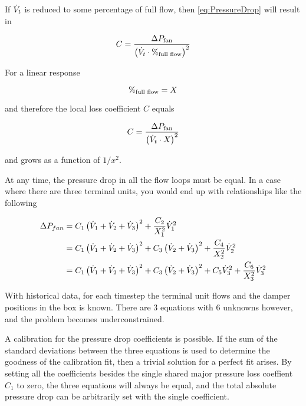 If \(\dot{V}_{t}\) is reduced to some percentage of full flow, then  \ref{eq:PressureDrop} will result in

 \begin{equation}
     C = \frac{\Delta P_{\text{fan}}}{\left( \dot{V}_{t} \cdot \%_{\text{full flow}} \right)^2}
 \end{equation}
 
For a linear response

\begin{equation}
    \%_{\text{full flow}} = X_{}
\end{equation}

and therefore the local loss coefficient \(C\) equals


\begin{equation}
C = \frac{\Delta P_{\text{fan}}}{\left( \dot{V}_{t} \cdot X_{}  \right)^2}
\end{equation}

and grows as a function of \(1/x^2\). 


At any time, the pressure drop in all the flow loops must be equal. In a case where there are three terminal units, you would end up with relationships like the following

\begin{align}
    \Delta P_{fan}  &= C_1 \left(\dot{V}_{1}+\dot{V}_{2}+\dot{V}_{3} \right)^2 + \frac{C_2}{X_{1}^2}\dot{V}_{1}^2 \\
                    &= C_1 \left(\dot{V}_{1}+\dot{V}_{2}+\dot{V}_{3} \right)^2 + C_3\left(\dot{V}_{2}+\dot{V}_{3} \right)^2 + \frac{C_4}{X_{2}^2}\dot{V}_{2}^2 \\
                    &= C_1 \left(\dot{V}_{1}+\dot{V}_{2}+\dot{V}_{3} \right)^2 + C_3\left(\dot{V}_{2}+\dot{V}_{3} \right)^2 + C_5\dot{V}_{3}^2 + \frac{C_6}{X_{3}^2}\dot{V}_{3}^2 
\end{align}

With historical data, for each timestep the terminal unit flows and the damper positions in the box is known. There are 3 equations with 6 unknowns however, and the problem becomes underconstrained. 

A calibration for the pressure drop coefficients is possible. If the sum of the standard deviations between the three equations is used to determine the goodness of the calibration fit, then a trivial solution for a perfect fit arises. By setting all the coefficients besides the single shared major pressure loss coeffient \(C_1\) to zero, the three equations will always be equal, and the total absolute pressure drop can be arbitrarily set with the single coefficient. 

